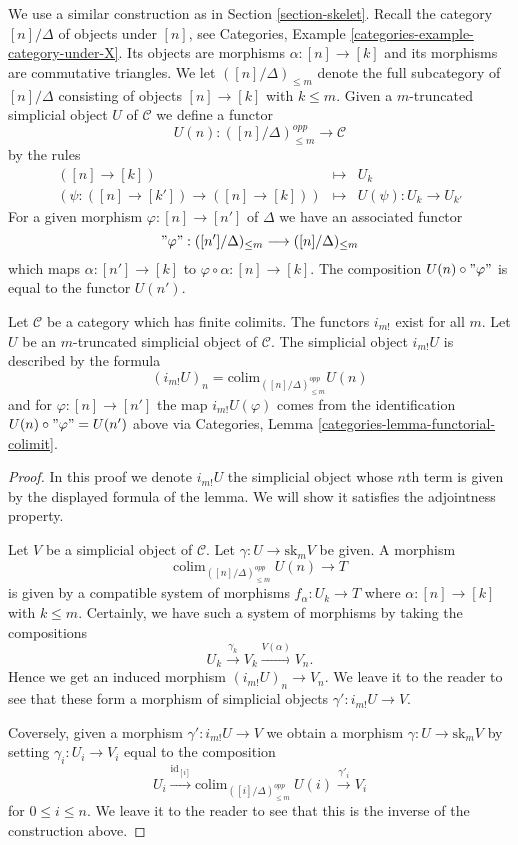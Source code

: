 \medskip\noindent
We use a similar construction as in Section \ref{section-skelet}.
Recall the category $[n]/\Delta$ of objects
under $[n]$, see
Categories, Example \ref{categories-example-category-under-X}.
Its objects are morphisms $\alpha : [n] \to [k]$
and its morphisms are commutative triangles.
We let $([n]/\Delta)_{\leq m}$ denote the full subcategory
of $[n]/\Delta$ consisting of objects $[n] \to [k]$
with $k \leq m$. Given a $m$-truncated
simplicial object $U$ of $\mathcal{C}$
we define a functor
$$
U(n) : ([n]/\Delta)_{\leq m}^{opp} \longrightarrow \mathcal{C}
$$
by the rules
\begin{eqnarray*}
([n] \to [k]) & \longmapsto & U_k \\
(\psi : ([n] \to [k']) \to ([n] \to [k]))
& \longmapsto &
U(\psi) : U_k \to U_{k'}
\end{eqnarray*}
For a given morphism $\varphi : [n] \to [n']$ of $\Delta$
we have an associated functor
$$
"\varphi" : ([n']/\Delta)_{\leq m} \longrightarrow ([n]/\Delta)_{\leq m}
$$
which maps $\alpha : [n'] \to [k]$ to
$\varphi \circ \alpha : [n] \to [k]$.
The composition $U(n) \circ "\varphi"$ is
equal to the functor $U(n')$.

\begin{lemma}
\label{lemma-left-adjoint-exists}
Let $\mathcal{C}$ be a category which has finite colimits.
The functors $i_{m!}$ exist for all $m$.
Let $U$ be an $m$-truncated simplicial object of $\mathcal{C}$.
The simplicial object $i_{m!}U$
is described by the formula
$$
(i_{m!}U)_n = \text{colim}_{([n]/\Delta)_{\leq m}^{opp}} U(n)
$$
and for $\varphi : [n] \to [n']$ the map
$i_{m!}U(\varphi)$ comes from the
identification $U(n) \circ "\varphi" = U(n')$ above 
via Categories, Lemma \ref{categories-lemma-functorial-colimit}.
\end{lemma}

\begin{proof}
In this proof we denote $i_{m!}U$ the simplicial object
whose $n$th term is given by the displayed formula of the 
lemma. We will show it satisfies the adjointness property.

\medskip\noindent
Let $V$ be a simplicial object of $\mathcal{C}$.
Let $\gamma : U \to \text{sk}_mV$ be given.
A morphism
$$
\text{colim}_{([n]/\Delta)_{\leq m}^{opp}}\ U(n) \to T
$$
is given by a compatible system of morphisms
$f_\alpha : U_k \to T$ where $\alpha : [n] \to [k]$
with $k \leq m$. Certainly, we have such a system of
morphisms by taking the compositions 
$$
U_k \xrightarrow{\gamma_k} V_k \xrightarrow{V(\alpha)} V_n.
$$
Hence we get an induced morphism $(i_{m!}U)_n \to V_n$.
We leave it to the reader to see that these form a 
morphism of simplicial objects $\gamma' : i_{m!}U \to V$.

\medskip\noindent
Coversely, given a morphism $\gamma' : i_{m!}U \to V$ we obtain
a morphism $\gamma : U \to \text{sk}_m V$ by setting
$\gamma_i : U_i \to V_i$ equal to the composition
$$
U_i
\xrightarrow{\text{id}_{[i]}}
\text{colim}_{([i]/\Delta)_{\leq m}^{opp}}\ U(i)
\xrightarrow{\gamma'_i}
V_i
$$
for $0 \leq i \leq n$. We leave it to the reader to see that
this is the inverse of the construction above.
\end{proof}

